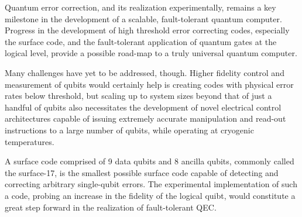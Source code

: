 Quantum error correction, and its realization experimentally, remains a key
milestone in the development of a scalable, fault-tolerant quantum computer.
Progress in the development of high threshold error correcting codes, especially
the surface code, and the fault-tolerant application of quantum gates at the
logical level, provide a possible road-map to a truly universal quantum
computer.

Many challenges have yet to be addressed, though. Higher fidelity control and
measurement of qubits would certainly help is creating codes with physical error
rates below threshold, but scaling up to system sizes beyond that of just a
handful of qubits also necessitates the development of novel electrical control
architectures capable of issuing extremely accurate manipulation and read-out
instructions to a large number of qubits, while operating at cryogenic
temperatures.

A surface code comprised of 9 data qubits and 8 ancilla qubits, commonly called
the surface-17, is the smallest possible surface code capable of detecting and
correcting arbitrary single-qubit errors. The experimental implementation of
such a code, probing an increase in the fidelity of the logical quibt, would
constitute a great step forward in the realization of fault-tolerant QEC.


